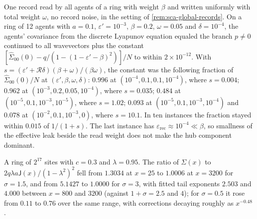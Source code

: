 \begin{numcheck}\label{chk:sca-global-records}
One record read by all agents of a ring with weight $\beta$ and written uniformly with total weight $\omega$, no record noise, in the setting of \cref{rem:sca-global-records}. On a ring of 12 agents with $a=0.1$, $\varepsilon'=10^{-3}$, $\beta=0.2$, $\omega=0.05$ and $\delta=10^{-4}$, the agents' covariance from the discrete Lyapunov equation equaled the branch $p\neq0$ continued to all wavevectors plus the constant $[\hat\Sigma_{00}(0)-q/(1-(1-\varepsilon'-\beta)^2)]/N$ to within $2\times10^{-12}$. With $s=(\varepsilon'+\mathcal R\delta)(\beta+\omega)/(\beta\omega)$, the constant was the following fraction of $\hat\Sigma_{00}(0)/N$ at $(\varepsilon',\beta,\omega,\delta)$: $0.996$ at $(10^{-4},0.1,0.1,10^{-4})$, where $s=0.004$; $0.962$ at $(10^{-3},0.2,0.05,10^{-4})$, where $s=0.035$; $0.484$ at $(10^{-5},0.1,10^{-3},10^{-5})$, where $s=1.02$; $0.093$ at $(10^{-5},0.1,10^{-3},10^{-4})$ and $0.078$ at $(10^{-2},0.1,10^{-3},0)$, where $s=10.1$. In ten instances the fraction stayed within $0.015$ of $1/(1+s)$. The last instance has $\varepsilon_{\mathrm{rec}}\approx10^{-4}\ll\beta$, so smallness of the effective leak beside the read weight does not make the hub component dominant.
\end{numcheck}

\begin{numcheck}\label{chk:sca-longrange}
A ring of $2^{17}$ sites with $c=0.3$ and $\lambda=0.95$. The ratio of $\Sigma(x)$ to $2q\lambda a\mathsf J(x)/(1-\lambda^2)^2$ fell from $1.3034$ at $x=25$ to $1.0006$ at $x=3200$ for $\sigma=1.5$, and from $5.1427$ to $1.0000$ for $\sigma=3$, with fitted tail exponents $2.503$ and $4.000$ between $x=800$ and $3200$ (against $1+\sigma=2.5$ and $4$); for $\sigma=0.5$ it rose from $0.11$ to $0.76$ over the same range, with corrections decaying roughly as $x^{-0.48}$.
\end{numcheck}

